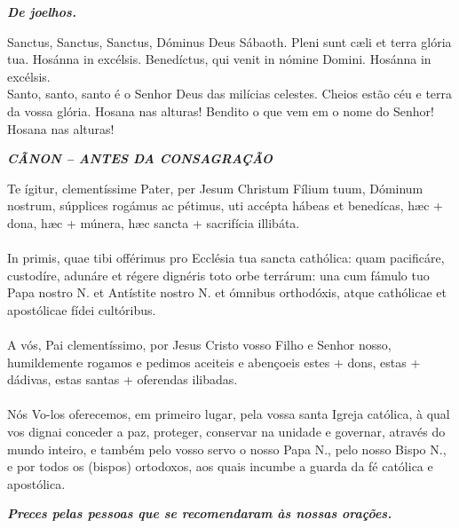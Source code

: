 \begin{flushleft}
	\textbf{\textit{De joelhos.}}
\end{flushleft}

\begin{multicols}{2}
	\noindent Sanctus, Sanctus, Sanctus, Dóminus Deus Sábaoth. Pleni sunt cæli et terra glória tua. Hosánna in excélsis. 
	Benedíctus, qui venit in nómine Domini. Hosánna in excélsis.
	\\ Santo, santo, santo é o Senhor Deus das milícias celestes. Cheios estão céu e terra da vossa glória. Hosana nas alturas! Bendito o que vem em o nome do Senhor! Hosana nas alturas!
\end{multicols}

\begin{center}
	\textit{\textbf{CÃNON – ANTES DA CONSAGRAÇÃO}}
\end{center}
\begin{multicols}{2}
\noindent Te ígitur, clementíssime Pater, per Jesum Christum Fílium tuum, Dóminum nostrum, súpplices rogámus ac pétimus, uti accépta hábeas et benedícas, hæc + dona, hæc + múnera, hæc sancta + sacrifícia illibáta. 
\\
\\In primis, quae tibi offérimus pro Ecclésia tua sancta cathólica: quam pacificáre, custodíre, adunáre et régere dignéris toto orbe terrárum: una cum fámulo tuo Papa nostro N. et Antístite nostro N. et ómnibus orthodóxis, atque cathólicae et apostólicae fídei cultóribus.
\\
\\A vós, Pai clementíssimo, por Jesus Cristo vosso Filho e Senhor nosso, humildemente rogamos e pedimos aceiteis e abençoeis estes + dons, estas + dádivas, estas santas + oferendas ilibadas. 
\\
\\Nós Vo-los oferecemos, em primeiro lugar, pela vossa santa Igreja católica, à qual vos dignai conceder a paz, proteger, conservar na unidade e governar, através do mundo inteiro, e também pelo vosso servo o nosso Papa N., pelo nosso Bispo N., e por todos os (bispos) ortodoxos, aos quais incumbe a guarda da fé católica e apostólica.
\end{multicols}
\begin{flushleft}
	\textbf{\textit{Preces pelas pessoas que se recomendaram às nossas orações.}}
\end{flushleft}
